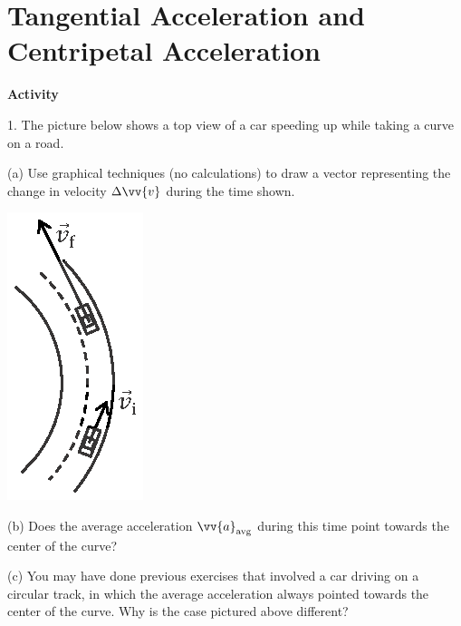 \section{Tangential Acceleration and Centripetal Acceleration}

\makelabheader %

\textbf{Activity}

1. The picture below shows a top view of a car speeding up while taking a curve on a road. 

(a)  Use graphical techniques (no calculations) to draw a vector representing the change in velocity $\Delta \vv{v}$ during the time shown.

\hspace{1.0in}\includegraphics{tangential_and_centripetal_acc/curve1.eps}

(b) Does the average acceleration $\vv{a}_{\rm avg}$ during this time point towards the center of the curve?
\answerspace{0.3in}


(c) You may have done previous exercises
that involved a car driving on a circular track, in which the average acceleration always pointed towards the center of the curve.  
Why is the case pictured above different?
\answerspace{0.3in}

